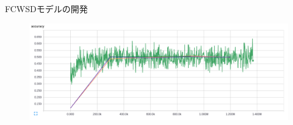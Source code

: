 \documentclass[aspectratio=43,unicode,10pt]{beamer}
\begin{document}
\begin{frame}{FCWSDモデルの開発}
  \begin{figure}
    \includegraphics[width=\textwidth]{graph.png}
  \end{figure}
\end{frame}
\end{document}

